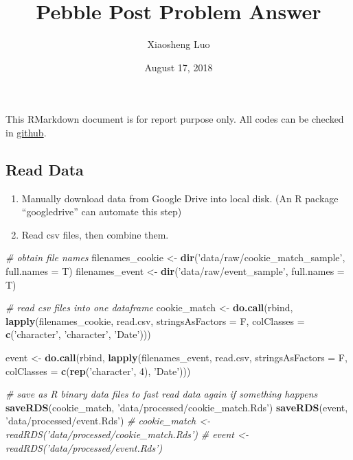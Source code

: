 \documentclass[]{article}
\title{Pebble Post Problem Answer}
\author{Xiaosheng Luo}
\date{August 17, 2018}
\newenvironment{Shaded}{\begin{snugshade}}{\end{snugshade}}
\newcommand{\KeywordTok}[1]{\textcolor[rgb]{0.13,0.29,0.53}{\textbf{#1}}}
\newcommand{\DataTypeTok}[1]{\textcolor[rgb]{0.13,0.29,0.53}{#1}}
\newcommand{\DecValTok}[1]{\textcolor[rgb]{0.00,0.00,0.81}{#1}}
\newcommand{\StringTok}[1]{\textcolor[rgb]{0.31,0.60,0.02}{#1}}
\newcommand{\CommentTok}[1]{\textcolor[rgb]{0.56,0.35,0.01}{\textit{#1}}}
\newcommand{\NormalTok}[1]{#1}
\begin{document}
\maketitle

This RMarkdown document is for report purpose only. All codes can be
checked in
\href{https://github.com/trinityluo/PebblePostProblems.git}{github}.

\subsection{Read Data}\label{read-data}

\begin{enumerate}
\def\labelenumi{\arabic{enumi}.}
\item
  Manually download data from Google Drive into local disk. (An R
  package ``googledrive'' can automate this step)
\item
  Read csv files, then combine them.
\end{enumerate}

\begin{Shaded}
\begin{Highlighting}[]
\CommentTok{# obtain file names}
\NormalTok{filenames_cookie <-}\StringTok{ }\KeywordTok{dir}\NormalTok{(}\StringTok{'data/raw/cookie_match_sample'}\NormalTok{, }\DataTypeTok{full.names =}\NormalTok{ T)}
\NormalTok{filenames_event <-}\StringTok{ }\KeywordTok{dir}\NormalTok{(}\StringTok{'data/raw/event_sample'}\NormalTok{, }\DataTypeTok{full.names =}\NormalTok{ T)}

\CommentTok{# read csv files into one dataframe}
\NormalTok{cookie_match <-}\StringTok{ }\KeywordTok{do.call}\NormalTok{(rbind, }\KeywordTok{lapply}\NormalTok{(filenames_cookie, read.csv,}
                                       \DataTypeTok{stringsAsFactors =}\NormalTok{ F,}
                                       \DataTypeTok{colClasses =} \KeywordTok{c}\NormalTok{(}\StringTok{'character'}\NormalTok{, }\StringTok{'character'}\NormalTok{, }\StringTok{'Date'}\NormalTok{)))}

\NormalTok{event <-}\StringTok{ }\KeywordTok{do.call}\NormalTok{(rbind, }\KeywordTok{lapply}\NormalTok{(filenames_event, read.csv,}
                                \DataTypeTok{stringsAsFactors =}\NormalTok{ F,}
                                \DataTypeTok{colClasses =} \KeywordTok{c}\NormalTok{(}\KeywordTok{rep}\NormalTok{(}\StringTok{'character'}\NormalTok{, }\DecValTok{4}\NormalTok{), }\StringTok{'Date'}\NormalTok{)))}

\CommentTok{# save as R binary data files to fast read data again if something happens}
\KeywordTok{saveRDS}\NormalTok{(cookie_match, }\StringTok{'data/processed/cookie_match.Rds'}\NormalTok{)}
\KeywordTok{saveRDS}\NormalTok{(event, }\StringTok{'data/processed/event.Rds'}\NormalTok{)}
\CommentTok{# cookie_match <- readRDS('data/processed/cookie_match.Rds')}
\CommentTok{# event <- readRDS('data/processed/event.Rds')}
\end{Highlighting}
\end{Shaded}
\end{document}
